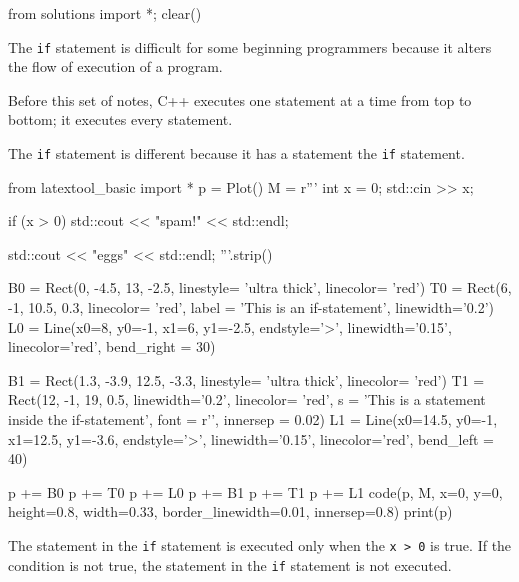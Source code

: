 \begin{python0}
from solutions import *; clear()
\end{python0}

The \verb!if! statement is difficult for some beginning programmers
because it alters the flow of execution of a program.

Before this set of notes, C++ executes one statement at a time from top
to bottom; it executes every statement.

The \verb!if! statement is different because it has a statement
 the \verb!if! statement.
\begin{python}
from latextool_basic import *
p = Plot()
M = r'''
int x = 0;
std::cin >> x;
                                                                          
if (x > 0)
    std::cout << "spam!" << std::endl;

std::cout << "eggs" << std::endl;
'''.strip()

B0 = Rect(0, -4.5, 13, -2.5, linestyle= 'ultra thick', linecolor= 'red')
T0 = Rect(6, -1, 10.5, 0.3,  linecolor= 'red', label = 'This is an if-statement', linewidth='0.2')
L0 = Line(x0=8, y0=-1, x1=6, y1=-2.5, endstyle='>', linewidth='0.15', linecolor='red', bend_right = 30)

B1 = Rect(1.3, -3.9, 12.5, -3.3, linestyle= 'ultra thick', linecolor= 'red')
T1 = Rect(12, -1, 19, 0.5, linewidth='0.2', linecolor= 'red', s = 'This is a statement inside the if-statement', font = r'\large', innersep = 0.02)
L1 = Line(x0=14.5, y0=-1, x1=12.5, y1=-3.6, endstyle='>', linewidth='0.15', linecolor='red', bend_left = 40)

p += B0
p += T0
p += L0
p += B1
p += T1
p += L1
code(p, M, x=0, y=0, height=0.8, width=0.33, border_linewidth=0.01, innersep=0.8)
print(p)
\end{python}


The statement in the \verb!if! statement is executed only when the
\verb!x > 0! is true. If the condition is not true, the
statement in the \verb!if! statement is not executed.

